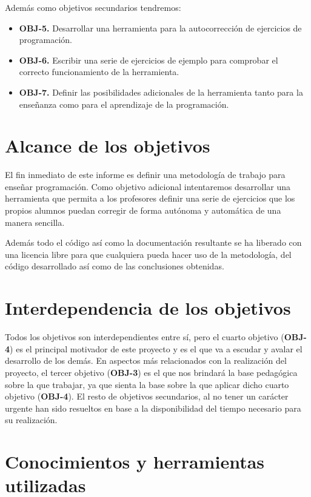 Además como objetivos secundarios tendremos:

\begin{itemize}
  \item \textbf{OBJ-5.} Desarrollar una herramienta para la autocorrección de ejercicios de programación.
  \item \textbf{OBJ-6.} Escribir una serie de ejercicios de ejemplo para comprobar el correcto funcionamiento de la herramienta.
  \item \textbf{OBJ-7.} Definir las posibilidades adicionales de la herramienta tanto para la enseñanza como para el aprendizaje de la programación.
\end{itemize}

\section{Alcance de los objetivos}
El fin inmediato de este informe es definir una metodología de trabajo para enseñar programación. Como objetivo adicional intentaremos desarrollar una herramienta que permita a los profesores definir una serie de ejercicios que los propios alumnos puedan corregir de forma autónoma y automática de una manera sencilla.

\bigskip
Además todo el código así como la documentación resultante se ha liberado con una licencia libre para que cualquiera pueda hacer uso de la metodología, del código desarrollado así como de las conclusiones obtenidas.

\section{Interdependencia de los objetivos}

Todos los objetivos son interdependientes entre sí, pero el cuarto objetivo (\textbf{OBJ-4}) es el principal motivador de este proyecto y es el que va a escudar y avalar el desarrollo de los demás. En aspectos más relacionados con la realización del proyecto, el tercer objetivo (\textbf{OBJ-3}) es el que nos brindará la base pedagógica sobre la que trabajar, ya que sienta la base sobre la que aplicar dicho cuarto objetivo (\textbf{OBJ-4}). El resto de objetivos secundarios, al no tener un carácter urgente han sido resueltos en base a la disponibilidad del tiempo necesario para su realización.

\section{Conocimientos y herramientas utilizadas}

